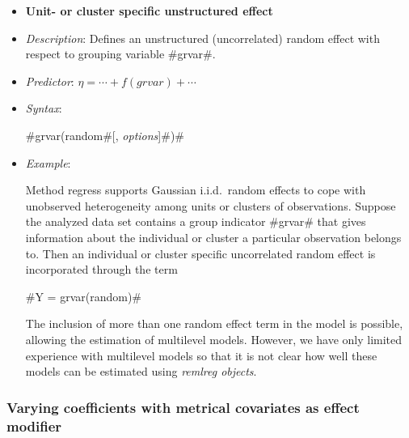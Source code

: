 \begin{itemize}
\item[]{\bf\sffamily Unit- or cluster specific unstructured
effect}

\item[] {\em Description}: Defines an unstructured (uncorrelated)
random effect with respect to grouping variable #grvar#. \item[]
{\em Predictor}: $\eta = \cdots + f(grvar) + \cdots$ \item[] {\em
Syntax}:

#grvar(random#[, {\em options}]#)#
\item[] {\em Example}:

Method regress supports Gaussian i.i.d.~random effects to cope with
unobserved heterogeneity among units or clusters of observations.
Suppose the analyzed data set contains a group indicator #grvar#
that gives information about the individual or cluster a particular
observation belongs to. Then an individual or cluster specific
uncorrelated random effect is incorporated through the term

#Y = grvar(random)#

The inclusion of more than one random effect term in the model is
possible, allowing the estimation of multilevel models. However,
we have only limited experience with multilevel models so that it
is not clear how well these models can be estimated using {\em
remlreg objects}.
\end{itemize}

\subsubsection*{Varying coefficients with metrical covariates as
effect modifier}

